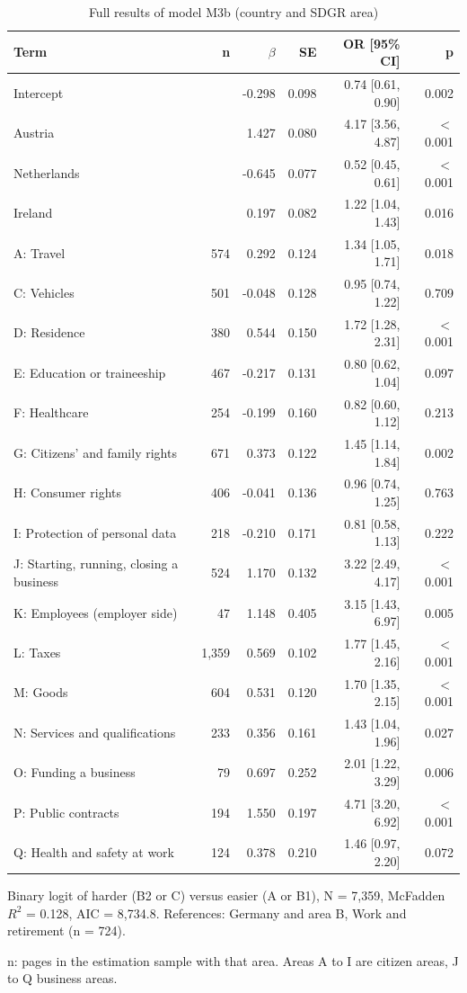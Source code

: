 \begin{table}[htbp]
\centering
\small
\begin{threeparttable}
\caption{Full results of model M3b (country and SDGR area)}
\label{tab:regression-m3b-full}
\begin{tabular}{lrrrrr}
\hline
Term & n & $\beta$ & SE & OR [95\% CI] & p \\
\hline
Intercept &  & -0.298 & 0.098 & 0.74 [0.61, 0.90] & 0.002 \\
\hline
Austria &  & 1.427 & 0.080 & 4.17 [3.56, 4.87] & $<$0.001 \\
Netherlands &  & -0.645 & 0.077 & 0.52 [0.45, 0.61] & $<$0.001 \\
Ireland &  & 0.197 & 0.082 & 1.22 [1.04, 1.43] & 0.016 \\
\hline
A: Travel & 574 & 0.292 & 0.124 & 1.34 [1.05, 1.71] & 0.018 \\
C: Vehicles & 501 & -0.048 & 0.128 & 0.95 [0.74, 1.22] & 0.709 \\
D: Residence & 380 & 0.544 & 0.150 & 1.72 [1.28, 2.31] & $<$0.001 \\
E: Education or traineeship & 467 & -0.217 & 0.131 & 0.80 [0.62, 1.04] & 0.097 \\
F: Healthcare & 254 & -0.199 & 0.160 & 0.82 [0.60, 1.12] & 0.213 \\
G: Citizens' and family rights & 671 & 0.373 & 0.122 & 1.45 [1.14, 1.84] & 0.002 \\
H: Consumer rights & 406 & -0.041 & 0.136 & 0.96 [0.74, 1.25] & 0.763 \\
I: Protection of personal data & 218 & -0.210 & 0.171 & 0.81 [0.58, 1.13] & 0.222 \\
\hline
J: Starting, running, closing a business & 524 & 1.170 & 0.132 & 3.22 [2.49, 4.17] & $<$0.001 \\
K: Employees (employer side) & 47 & 1.148 & 0.405 & 3.15 [1.43, 6.97] & 0.005 \\
L: Taxes & 1,359 & 0.569 & 0.102 & 1.77 [1.45, 2.16] & $<$0.001 \\
M: Goods & 604 & 0.531 & 0.120 & 1.70 [1.35, 2.15] & $<$0.001 \\
N: Services and qualifications & 233 & 0.356 & 0.161 & 1.43 [1.04, 1.96] & 0.027 \\
O: Funding a business & 79 & 0.697 & 0.252 & 2.01 [1.22, 3.29] & 0.006 \\
P: Public contracts & 194 & 1.550 & 0.197 & 4.71 [3.20, 6.92] & $<$0.001 \\
Q: Health and safety at work & 124 & 0.378 & 0.210 & 1.46 [0.97, 2.20] & 0.072 \\
\hline
\end{tabular}
\begin{tablenotes}
\footnotesize
\item Binary logit of harder (B2 or C) versus easier (A or B1), N = 7,359, McFadden $R^2$ = 0.128, AIC = 8,734.8. References: Germany and area B, Work and retirement (n = 724).
\item n: pages in the estimation sample with that area. Areas A to I are citizen areas, J to Q business areas.
\end{tablenotes}
\end{threeparttable}
\end{table}
